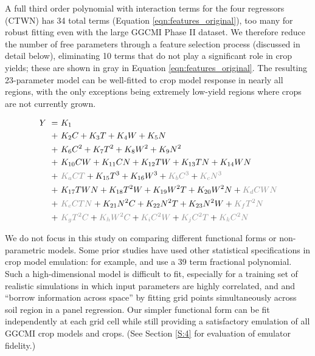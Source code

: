 \documentclass[gmd, manuscript]{copernicus} %
\begin{document}
A full third order polynomial with interaction terms for the four regressors (CTWN) has 34 total terms (Equation \ref{eqn:features_original}), too many for robust fitting even with the large GGCMI Phase II dataset. %
We therefore reduce the number of free parameters 
through a feature selection process (discussed in detail below), eliminating 10 terms that do not play a significant role in crop yields; these are shown in {\color{dark-gray}gray} in Equation \ref{eqn:features_original}. 
The resulting 23-parameter model can be well-fitted to crop model response in nearly all regions, with the only exceptions being extremely low-yield regions where crops are not currently grown.

\begin{align}
    \label{eqn:features_original}
    Y\ = \ & K_{1}  \\
    + \ & K_{2} C      + K_{3} T      + K_{4} W      + K_{5} N   \nonumber \\
    + \ & K_{6} C^2    + K_{7} T^2    + K_{8} W^2    + K_{9} N^2 \nonumber \\
    + \ & K_{10} C W   + K_{11} C N   + K_{12} T W   + K_{13} T N   + K_{14} W N \nonumber \\
    + \ & {\color{dark-gray}K_{a} C T} + K_{15} T^3   + K_{16} W^3   + {\color{dark-gray}K_{b} C^3} + {\color{dark-gray}K_{c} N^3} \nonumber \\
    + \ & K_{17} T W N + K_{18} T^2 W + K_{19} W^2 T + K_{20} W^2 N + {\color{dark-gray}K_{d} C W N} \nonumber \\
    + \ & {\color{dark-gray}K_{e} C T N} + K_{21} N^2 C + K_{22} N^2 T + K_{23} N^2 W + {\color{dark-gray}K_{f} T^2 N} \nonumber \\
    + \ & {\color{dark-gray}K_{g} T^2 C} + {\color{dark-gray}K_{h} W^2 C} + {\color{dark-gray}K_{i} C^2 W} + {\color{dark-gray}K_{j} C^2 T} + {\color{dark-gray}K_{k} C^2 N} \nonumber
\end{align}

We do not focus in this study on comparing different functional forms or non-parametric models.
Some prior studies have used other statistical specifications in crop model emulation: for example, \citet{BLANC2015} and \citet{BLANC2017} use a 39 term fractional polynomial. 
Such a high-dimensional model is difficult to fit, especially for a training set of realistic simulations in which input parameters are highly correlated, and  \citet{BLANC2015} and \citet{BLANC2017}  ``borrow information across space'' by fitting grid points simultaneously across soil region in a panel regression. 
Our simpler functional form can be fit independently at each grid cell while still providing a satisfactory emulation of all GGCMI crop models and crops. 
(See Section \ref{S:4} for evaluation of emulator fidelity.)
\end{document}

